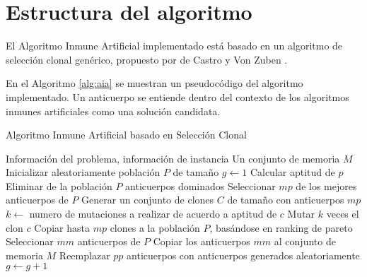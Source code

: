 \section{Estructura del algoritmo}

El Algoritmo Inmune Artificial implementado está basado en un algoritmo de selección clonal genérico, propuesto por de Castro y Von Zuben \cite{read2012introduction}.

En el Algoritmo \ref{alg:aia} se muestran un pseudocódigo del algoritmo implementado. Un anticuerpo se entiende dentro del contexto de los algoritmos inmunes artificiales como una solución candidata. 

\begin{algorithm}
\caption{Algoritmo Inmune Artificial basado en Selección Clonal}\label{alg:aia}
\begin{algorithmic}[1]
\REQUIRE  Información del problema, información de instancia
\ENSURE Un conjunto de memoria $M$
\STATE Inicializar aleatoriamente población $P$ de tamaño \popsize
\STATE $g \leftarrow 1$
		\STATE Calcular aptitud de $p$
	\ENDFOR
	\STATE Eliminar de la población $P$ anticuerpos dominados
	\STATE Seleccionar $mp$ de los mejores anticuerpos de $P$
	\STATE Generar un conjunto de clones $C$ de tamaño \clonsize{} con anticuerpos $mp$
		\STATE $k \leftarrow$ numero de mutaciones a realizar de acuerdo a aptitud de $c$		
		\STATE Mutar $k$ veces el clon $c$
	\ENDFOR
	\STATE Copiar hasta $mp$ clones a la población $P$, basándose en ranking de pareto
	\STATE Seleccionar $mm$ anticuerpos de $P$
	\STATE Copiar los anticuerpos $mm$ al conjunto de memoria $M$
	\STATE Reemplazar $pp$ anticuerpos con anticuerpos generados aleatoriamente
	\STATE $g \leftarrow g+1$
\ENDWHILE
\end{algorithmic}
\end{algorithm}
